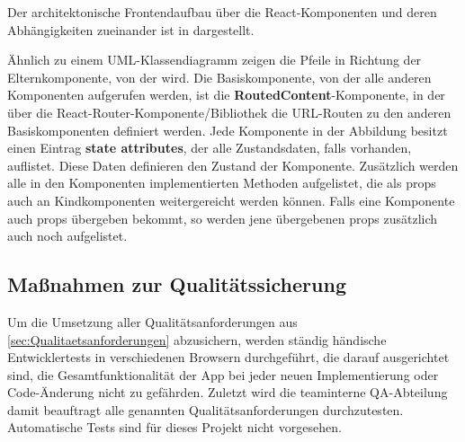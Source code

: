 Der architektonische Frontendaufbau über die React-Komponenten und deren Abhängigkeiten zueinander ist in  dargestellt. 

Ähnlich zu einem \acs{UML}-Klassendiagramm zeigen die Pfeile in Richtung der Elternkomponente, von der  wird. Die Basiskomponente, von der alle anderen Komponenten aufgerufen werden, ist die \textbf{RoutedContent}-Komponente, in der über die React-Router-Komponente/Bibliothek die URL-Routen zu den anderen Basiskomponenten definiert werden. Jede Komponente in der Abbildung besitzt einen Eintrag \textbf{state attributes}, der alle Zustandsdaten, falls vorhanden, auflistet. Diese Daten definieren den Zustand der Komponente. Zusätzlich werden alle in den Komponenten implementierten Methoden aufgelistet, die als props auch an Kindkomponenten weitergereicht werden können. Falls eine Komponente auch props übergeben bekommt, so werden jene übergebenen props zusätzlich auch noch aufgelistet.

\subsection{Maßnahmen zur Qualitätssicherung}
\label{sec:Qualitaetssicherung}

Um die Umsetzung aller Qualitätsanforderungen aus \ref{sec:Qualitaetsanforderungen} abzusichern, werden ständig händische Entwicklertests in verschiedenen Browsern durchgeführt, die darauf ausgerichtet sind, die Gesamtfunktionalität der App bei jeder neuen Implementierung oder Code-Änderung nicht zu gefährden. Zuletzt wird die teaminterne \acs{QA}-Abteilung damit beauftragt alle genannten Qualitätsanforderungen durchzutesten. Automatische Tests sind für dieses Projekt nicht vorgesehen.
